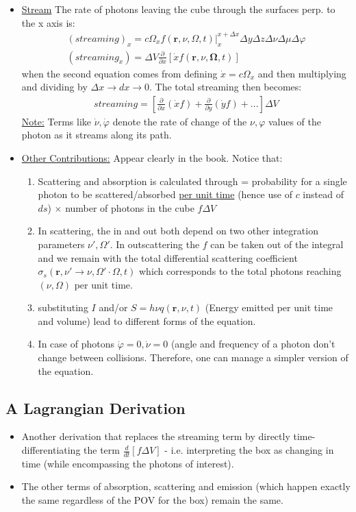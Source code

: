 \documentclass[15pt]{article}
\begin{document}
\begin{itemize}
\begin{enumerate}
\end{enumerate}
\item \underline{Stream} The rate of photons leaving the cube through the surfaces perp. to the x axis is:
\begin{align}
    (streaming)_x=c\Omega_xf(\bm r,\nu,\Omega,t)|^{x+\Delta x}_x\Delta y\Delta z\Delta \nu\Delta \mu\Delta \varphi \\
    (streaming_x)=\Delta V \frac{\partial}{\partial x}\left[\dot x f(\bm r,\nu,\bm\Omega,t)\right]
\end{align}
when the second equation comes from defining $\dot x=c\Omega_x$ and then multiplying and dividing by $\Delta x\to dx\to0$.
The total streaming then becomes:
\begin{align}
    streaming = \left[\frac{\partial}{\partial x}(\dot xf)+\frac{\partial}{\partial y}(\dot yf)+...\right] \Delta V
\end{align}
\underline{Note:} Terms like $\dot \nu,\dot \varphi$ denote the rate of change of the $\nu,\varphi$ values of the photon as it streams along its path.
\item\underline{Other Contributions:} Appear clearly in the book. Notice that: \begin{enumerate}
    \item Scattering and absorption is calculated through = probability for a single photon to be scattered/absorbed \underline{per unit time} (hence use of $c$ instead of $ds$) $\times$ number of photons in the cube $f\Delta V$
    \item In scattering, the in and out both depend on two other integration parameters $\nu',\Omega'$. In outscattering the $f$ can be taken out of the integral and we remain with the total differential scattering coefficient $\sigma_s(\bm r,\nu'\to\nu,\Omega'\cdot\Omega,t)$ which corresponds to the total photons reaching $(\nu,\Omega)$ per unit time.
    \item substituting $I$ and/or $S=h\nu q(\bm r,\nu,t)$ (Energy emitted per unit time and volume) lead to different forms of the equation.
    \item In case of photons $\dot \varphi=0, \dot \nu=0$ (angle and frequency of a photon don't change between collisions. Therefore, one can manage a simpler version of the equation. 

\end{enumerate}

\end{itemize}
\subsection{A Lagrangian Derivation}
\begin{itemize}
    \item Another derivation that replaces the streaming term by directly time-differentiating the term $\frac{d}{dt}\left[f\Delta V\right]$ - i.e. interpreting the box as changing in time (while encompassing the photons of interest). 
    \item The other terms of absorption, scattering and emission (which happen exactly the same regardless of the POV for the box) remain the same.

 \end{itemize}
\end{document}

